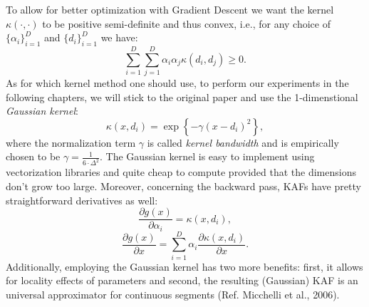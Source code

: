 \documentclass[LaM,binding=0.6cm]{./packages/sapthesis/sapthesis}
\begin{document}
    To allow for better optimization with Gradient Descent we want the kernel $\kappa(\cdot, \cdot)$ to be positive semi-definite and thus convex, i.e., for any choice of 
    $\{ \alpha_i\}_{i=1}^D $ and $\{ d_i\}_{i=1}^D $ we have:
    \begin{equation}
        \sum_{i=1}^{D} \sum_{j=1}^{D} \alpha_{i} \alpha_{j} \kappa\left(d_{i}, d_{j}\right) \geq 0 .
    \end{equation}
    As for which kernel method one should use, to perform our experiments in the following chapters, we will stick to the original paper and use the 1-dimenstional \textit{Gaussian kernel}:
    \begin{equation}
        \kappa\left(x, d_{i}\right)=\exp \left\{-\gamma\left(x-d_{i}\right)^{2}\right\},
    \end{equation}
    where the normalization term $\gamma$ is called \textit{kernel bandwidth} and is empirically chosen to be $ \gamma = \frac{1}{6 \cdot \Delta^2} $.
    The Gaussian kernel is easy to implement using vectorization libraries and quite cheap to compute provided that the dimensions don't grow too large. Moreover, 
    concerning the backward pass, KAFs have pretty straightforward derivatives as well:
    \begin{equation}
        \frac{\partial g(x)}{\partial \alpha_{i}}=\kappa\left(x, d_{i}\right),
    \end{equation}
    \begin{equation}
        \frac{\partial g(x)}{\partial x}=\sum_{i=1}^{D} \alpha_{i} \frac{\partial \kappa\left(x, d_{i}\right)}{\partial x}.
    \end{equation}
    Additionally, employing the Gaussian kernel has two more benefits: first, it allows for locality effects of parameters and second, the resulting (Gaussian) KAF
    is an universal approximator for continuous segments (Ref. Micchelli et al., 2006).
\end{document}
